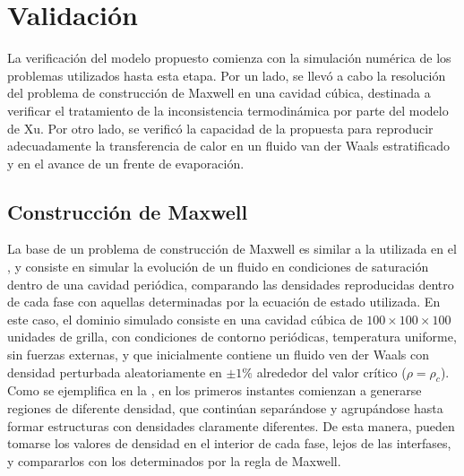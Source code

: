 \section{Validaci\'on}

La verificaci\'on del modelo propuesto comienza con la simulaci\'on num\'erica de los problemas utilizados hasta esta etapa. Por un lado, se llev\'o a cabo la resoluci\'on del problema de construcci\'on de Maxwell en una cavidad c\'ubica, destinada a verificar el tratamiento de la inconsistencia termodin\'amica por parte del modelo de Xu. Por otro lado, se verific\'o la capacidad de la \lbe{} propuesta para reproducir adecuadamente la transferencia de calor en un fluido van der Waals estratificado y en el avance de un frente de evaporaci\'on.



\subsection{Construcci\'on de Maxwell} 

La base de un problema de construcci\'on de Maxwell es similar a la utilizada en el , y consiste en simular la evoluci\'on de un fluido en condiciones de saturaci\'on dentro de una cavidad peri\'odica, comparando las densidades reproducidas dentro de cada fase con aquellas determinadas por la ecuaci\'on de estado utilizada. En este caso, el dominio simulado consiste en una cavidad c\'ubica de $100 \times 100 \times 100$ unidades de grilla, con condiciones de contorno peri\'odicas, temperatura uniforme, sin fuerzas externas, y que inicialmente contiene un fluido ven der Waals con densidad perturbada aleatoriamente en  $\pm 1\%$ alrededor del valor cr\'itico ($\rho=\rho_c$). Como se ejemplifica en la , en los primeros instantes comienzan a generarse regiones de diferente densidad, que contin\'uan separ\'andose y agrup\'andose hasta formar estructuras con densidades claramente diferentes. De esta manera, pueden tomarse los valores de densidad en el interior de cada fase, lejos de las interfases, y compararlos con los determinados por la regla de Maxwell.

